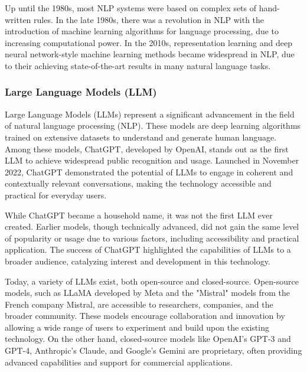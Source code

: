 \documentclass{article}
\begin{document}
Up until the 1980s, most NLP systems were based on complex sets of
hand-written rules. In the late 1980s, there was a revolution in NLP with
the introduction of machine learning algorithms for language processing,
due to increasing computational power. In the 2010s, representation learning
and deep neural network-style machine learning methods became widespread in
NLP, due to their achieving state-of-the-art results in many natural language
tasks.


\subsubsection{Large Language Models (LLM)}



Large Language Models (LLMs) represent a significant advancement
in the field of natural language processing (NLP).
These models are deep learning algorithms trained on extensive
datasets to understand and generate human language.
Among these models, ChatGPT, developed by OpenAI, stands
out as the first LLM to achieve widespread public recognition and usage.
Launched in November 2022, ChatGPT demonstrated the potential of
LLMs to engage in coherent and contextually relevant conversations,
making the technology accessible and practical for everyday users.

While ChatGPT became a household name, it was not the first LLM ever created.
Earlier models, though technically advanced, did not gain the same
level of popularity or usage due to various factors, including
accessibility and practical application. The success of ChatGPT highlighted
the capabilities of LLMs to a broader audience, catalyzing interest
and development in this technology.

Today, a variety of LLMs exist, both open-source and closed-source.
Open-source models, such as LLaMA developed by Meta and the "Mistral"
models from the French company Mistral, are accessible to researchers,
companies, and the broader community. These models encourage
collaboration and innovation by allowing a wide range of users
to experiment and build upon the existing technology. On the other hand,
closed-source models like OpenAI's GPT-3 and GPT-4, Anthropic's Claude,
and Google's Gemini are proprietary, often providing advanced
capabilities and support for commercial applications.
\end{document}
